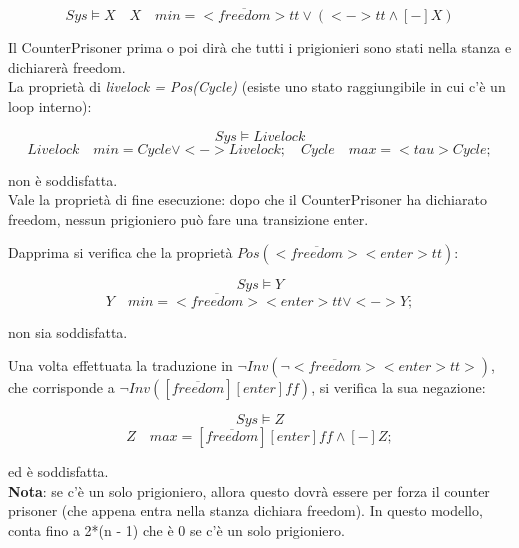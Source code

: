 \begin{equation*}
Sys \models X \quad
  X \quad min= <\overline{freedom}>tt \lor (<->tt \land [-]X)
\end{equation*}

Il CounterPrisoner prima o poi dirà che tutti i prigionieri sono stati nella
stanza e dichiarerà freedom. \\

La proprietà di \textit{livelock = Pos(Cycle)} (esiste uno stato raggiungibile
in cui c'è un loop interno):

\begin{equation*}
Sys \models Livelock
\end{equation*}
\begin{equation*}
Livelock \quad min= Cycle \lor <->Livelock; \quad
Cycle \quad max= <tau>Cycle;
\end{equation*}

non è soddisfatta. \\

Vale la proprietà di fine esecuzione: dopo che il CounterPrisoner ha dichiarato
freedom, nessun prigioniero può fare una transizione enter.

Dapprima si verifica che la proprietà $Pos(<\overline{freedom}><enter>tt)$:

\begin{equation*}
Sys \models Y
\end{equation*}
\begin{equation*}
Y \quad min= <\overline{freedom}><enter>tt \lor <->Y;
\end{equation*}

non sia soddisfatta.

Una volta effettuata la traduzione in $\neg Inv(\neg <\overline{freedom}><enter>tt>)$,
che corrisponde a $\neg Inv([\overline{freedom}][enter]ff)$, si verifica la sua negazione:

\begin{equation*}
Sys \models Z
\end{equation*}
\begin{equation*}
Z \quad max= [\overline{freedom}][enter]ff \land [-]Z;
\end{equation*}

ed è soddisfatta. \\

\textbf{Nota}: se c'è un solo prigioniero, allora questo dovrà essere per forza il
counter prisoner (che appena entra nella stanza dichiara freedom).
In questo modello, conta fino a 2*(n - 1) che è 0 se c'è un solo prigioniero.

